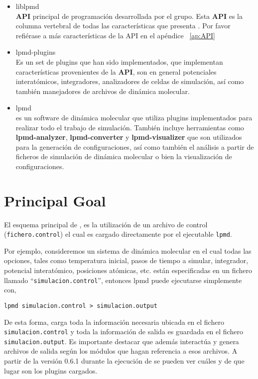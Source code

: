 \begin{itemize}
 \item liblpmd \\
\textbf{API} principal de programaci\'on desarrollada por el grupo. Esta \textbf{API} es la columna vertebral de todas las caracter\'isticas que presenta {\lpmd}. Por favor refi\'erase a m\'as caracter\'isticas de la API en el ap\'endice ~\ref{ap:API}
 \item lpmd-plugins \\
Es un set de plugins que han sido implementados, que implementan caracter\'isticas provenientes de la \textbf{API}, son en general potenciales interat\'omicos, integradores, analizadores de celdas de simulaci\'on, as\'i como tambi\'en manejadores de archivos de din\'amica molecular.
 \item lpmd \\
{\lpmd} es un software de din\'amica molecular que utiliza plugins implementados para realizar todo el trabajo de simulaci\'on. Tambi\'en incluye herramientas como \textbf{lpmd-analyzer}, \textbf{lpmd-converter} y \textbf{lpmd-visualizer} que son utilizados para la generaci\'on de configuraciones, as\'i como tambi\'en el an\'alisis a partir de ficheros de simulaci\'on de din\'amica molecular o bien la visualizaci\'on de configuraciones.
\end{itemize}

\section{Principal Goal}

El esquema principal de {\lpmd}, es la utilizaci\'on de un archivo de control (\verb|fichero.control|) el cual es cargado directamente por el ejecutable \verb|lpmd|.

Por ejemplo, consideremos un sistema de din\'amica molecular en el cual todas las opciones, tales como temperatura inicial, pasos de tiempo a simular, integrador, potencial interat\'omico, posiciones at\'omicas, etc. est\'an especificadas en un fichero llamado ``\verb|simulacion.control|'', entonces lpmd puede ejecutarse simplemente con,

\begin{center}
 \texttt{lpmd simulacion.control > simulacion.output}
\end{center}
\noindent

De esta forma, {\lpmd} carga toda la informaci\'on necesaria ubicada en el fichero \verb|simulacion.control| y toda la informaci\'on de salida es guardada en el fichero \verb|simulacion.output|. Es importante destacar que {\lpmd} adem\'as interact\'ua y genera archivos de salida seg\'un los m\'odulos que hagan referencia a esos archivos. A partir de la versi\'on 0.6.1 durante la ejecuci\'on de {\lpmd} se pueden ver cu\'ales y de que lugar son los plugins cargados.

